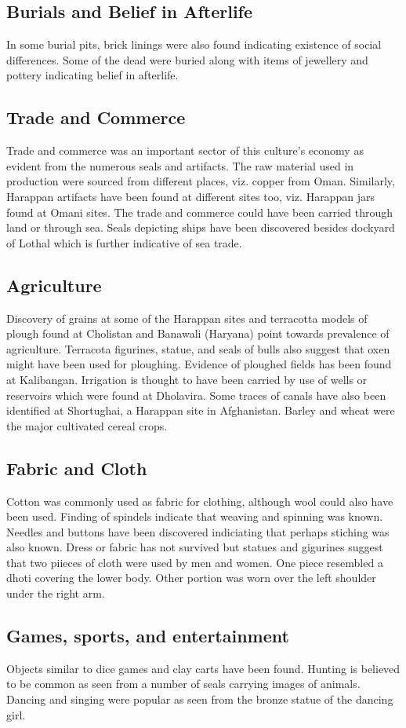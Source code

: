\documentclass[8pt, a4paper, oneside, twocolumn]{extarticle}
\begin{document}
\subsection{Burials and Belief in Afterlife}
In some burial pits, brick linings were also found indicating existence of social differences. Some of the dead were buried along with items of jewellery and pottery indicating belief in afterlife.

\subsection{Trade and Commerce}
Trade and commerce was an important sector of this culture's economy as evident from the numerous seals and artifacts. The raw material used in production were sourced from different places, viz. copper from Oman. Similarly, Harappan artifacts have been found at different sites too, viz. Harappan jars found at Omani sites. The trade and commerce could have been carried through land or through sea. Seals depicting ships have been discovered besides dockyard of Lothal which is further indicative of sea trade. 
\subsection{Agriculture}
Discovery of grains at some of the Harappan sites and terracotta models of plough found at Cholistan and Banawali (Haryana) point towards prevalence of agriculture. Terracota figurines, statue, and seals of bulls also suggest that oxen might have been used for ploughing. Evidence of ploughed fields has been found at Kalibangan. Irrigation is thought to have been carried by use of wells or reservoirs which were found at Dholavira. Some traces of canals have also been identified at Shortughai, a Harappan site in Afghanistan. Barley and wheat were the major cultivated cereal crops.
\subsection{Fabric and Cloth}
Cotton was commonly used as fabric for clothing, although wool could also have been used. Finding of spindels indicate that weaving and spinning was known. Needles and buttons have been discovered indiciating that perhaps stiching was also known. Dress or fabric has not survived but statues and gigurines suggest that two piieces of cloth were used by men and women. One piece resembled a dhoti covering the lower body. Other portion was worn over the left shoulder under the right arm. 

\subsection{Games, sports, and entertainment}
Objects similar to dice games and clay carts have been found. Hunting is believed to be common as seen from a number of seals carrying images of animals. Dancing and singing were popular as seen from the bronze statue of the dancing girl.
\end{document}
